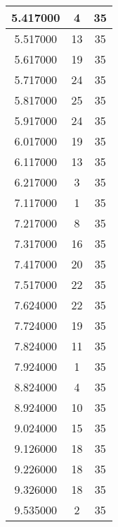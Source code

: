 \begin{longtable}[htbp]{|c|c|c|}
5.417000 & 4 & 35 \\ \hline
5.517000 & 13 & 35 \\ \hline
5.617000 & 19 & 35 \\ \hline
5.717000 & 24 & 35 \\ \hline
5.817000 & 25 & 35 \\ \hline
5.917000 & 24 & 35 \\ \hline
6.017000 & 19 & 35 \\ \hline
6.117000 & 13 & 35 \\ \hline
6.217000 & 3 & 35 \\ \hline
7.117000 & 1 & 35 \\ \hline
7.217000 & 8 & 35 \\ \hline
7.317000 & 16 & 35 \\ \hline
7.417000 & 20 & 35 \\ \hline
7.517000 & 22 & 35 \\ \hline
7.624000 & 22 & 35 \\ \hline
7.724000 & 19 & 35 \\ \hline
7.824000 & 11 & 35 \\ \hline
7.924000 & 1 & 35 \\ \hline
8.824000 & 4 & 35 \\ \hline
8.924000 & 10 & 35 \\ \hline
9.024000 & 15 & 35 \\ \hline
9.126000 & 18 & 35 \\ \hline
9.226000 & 18 & 35 \\ \hline
9.326000 & 18 & 35 \\ \hline
9.535000 & 2 & 35 \\ \hline
\end{longtable}
